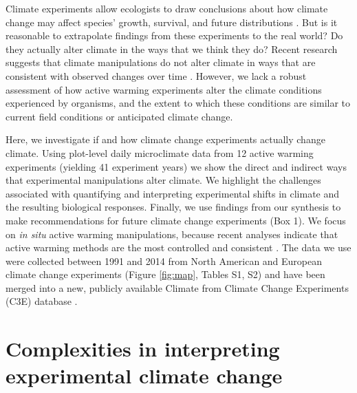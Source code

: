 \documentclass{article}
\begin{document}
\par Climate experiments allow ecologists to draw conclusions about how climate change may affect species' growth, survival, and future distributions \citep{dukes1999,hobbie1999,morin2010,chuine2012,reich2015,gruner2016}. But is it reasonable to extrapolate findings from these experiments to the real world? Do they actually alter climate in the ways that we think they do? Recent research suggests that climate manipulations do not alter climate in ways that are consistent with observed changes over time \citep{wolkovich2012}. However, we lack a robust assessment of how active warming experiments alter the climate conditions experienced by organisms, and the extent to which these conditions are similar to current field conditions or anticipated climate change. 

\par Here, we investigate if and how climate change experiments actually change climate. Using plot-level daily microclimate data from 12 active warming experiments (yielding 41 experiment years) we show the direct and indirect ways that experimental manipulations alter climate. We highlight the challenges associated with quantifying and interpreting experimental shifts in climate and the resulting biological responses. Finally, we use findings from our synthesis to make recommendations for future climate change experiments (Box 1). We focus on \textit{in situ} active warming manipulations, because recent analyses indicate that active warming methods are the most controlled and consistent \citep{kimball2005,kimball2008,aronson2009,wolkovich2012}. The data we use were collected between 1991 and 2014 from North American and European climate change experiments (Figure \ref{fig:map}, Tables S1, S2) and have been merged into a new, publicly available Climate from Climate Change Experiments (C3E) database \citep{ettinger2017}. 

\section* {Complexities in interpreting experimental climate change} 
\end{document}
